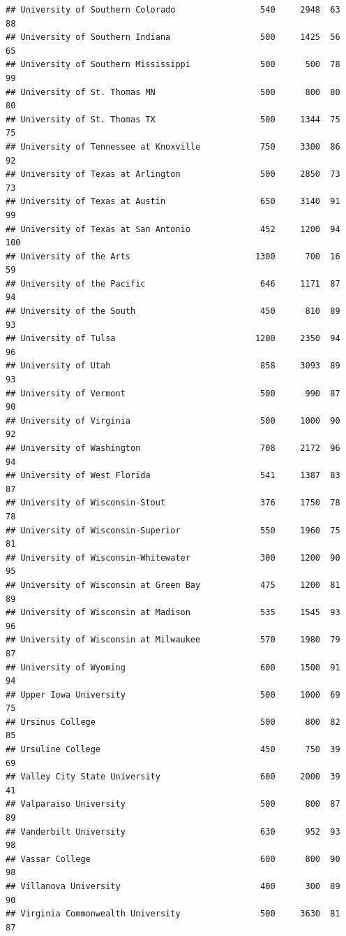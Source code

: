 \documentclass[
]{article}
\begin{document}
\begin{verbatim}
## University of Southern Colorado                 540     2948  63       88
## University of Southern Indiana                  500     1425  56       65
## University of Southern Mississippi              500      500  78       99
## University of St. Thomas MN                     500      800  80       80
## University of St. Thomas TX                     500     1344  75       75
## University of Tennessee at Knoxville            750     3300  86       92
## University of Texas at Arlington                500     2850  73       73
## University of Texas at Austin                   650     3140  91       99
## University of Texas at San Antonio              452     1200  94      100
## University of the Arts                         1300      700  16       59
## University of the Pacific                       646     1171  87       94
## University of the South                         450      810  89       93
## University of Tulsa                            1200     2350  94       96
## University of Utah                              858     3093  89       93
## University of Vermont                           500      990  87       90
## University of Virginia                          500     1000  90       92
## University of Washington                        708     2172  96       94
## University of West Florida                      541     1387  83       87
## University of Wisconsin-Stout                   376     1750  78       78
## University of Wisconsin-Superior                550     1960  75       81
## University of Wisconsin-Whitewater              300     1200  90       95
## University of Wisconsin at Green Bay            475     1200  81       89
## University of Wisconsin at Madison              535     1545  93       96
## University of Wisconsin at Milwaukee            570     1980  79       87
## University of Wyoming                           600     1500  91       94
## Upper Iowa University                           500     1000  69       75
## Ursinus College                                 500      800  82       85
## Ursuline College                                450      750  39       69
## Valley City State University                    600     2000  39       41
## Valparaiso University                           500      800  87       89
## Vanderbilt University                           630      952  93       98
## Vassar College                                  600      800  90       98
## Villanova University                            400      300  89       90
## Virginia Commonwealth University                500     3630  81       87

\end{verbatim}
\end{document}
